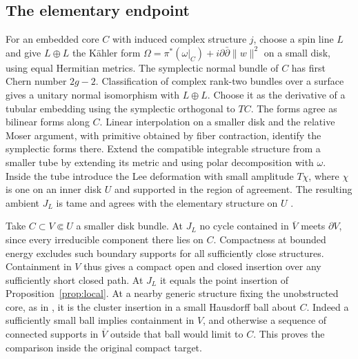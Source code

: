 \subsection{The elementary endpoint}
For an embedded core $C$ with induced complex structure $j$, choose
a spin line $L$ and give $L\oplus L$ the Kähler form
$\Omega=\pi^*(\omega|_C)+i\partial\bar\partial\|w\|^2$ on a small
disk, using equal Hermitian metrics. The symplectic normal bundle
of $C$ has first Chern number $2g-2$. Classification of complex
rank-two bundles over a surface gives a unitary normal isomorphism
with $L\oplus L$. Choose it as the derivative of a tubular embedding
using the symplectic orthogonal to $TC$. The forms agree as bilinear
forms along $C$. Linear interpolation on a smaller disk and the
relative Moser argument, with primitive obtained by fiber contraction,
identify the symplectic forms there. Extend the compatible integrable
structure from a smaller tube by extending its metric and using polar
decomposition with $\omega$. Inside the tube introduce the Lee
deformation with small amplitude $T\chi$, where $\chi$ is one on an
inner disk $U$ and supported in the region of agreement. The resulting
ambient $J_L$ is tame and agrees with the elementary structure on $U$
\cite[Proposition~3.2 and proof of Theorem~7.1]{IP}.

Take $C\subset V\Subset U$ a smaller disk bundle. At $J_L$ no cycle
contained in $\overline V$ meets $\partial V$, since every irreducible
component there lies on $C$. Compactness at bounded energy excludes
such boundary supports for all sufficiently close structures.
Containment in $V$ thus gives a compact open and closed insertion over
any sufficiently short closed path. At $J_L$ it equals the point
insertion of Proposition~\ref{prop:local}. At a nearby generic
structure fixing the unobstructed core, as in
\cite[Proposition~3.54]{DIW}, it is the cluster insertion in a small
Hausdorff ball about $C$. Indeed a sufficiently small ball implies
containment in $V$, and otherwise a sequence of connected supports
in $\overline V$ outside that ball would limit to $C$. This proves
the comparison inside the original compact target.

